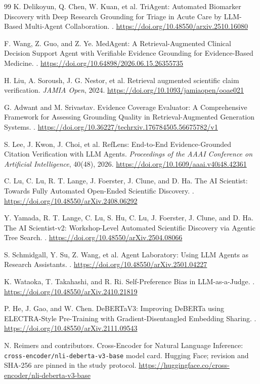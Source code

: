 \documentclass[11pt]{article}
\begin{document}
\begin{thebibliography}{99}
K. Delikoyun, Q. Chen, W. Kuan, et al.
\newblock TriAgent: Automated Biomarker Discovery with Deep Research Grounding for Triage in Acute Care by LLM-Based Multi-Agent Collaboration.
. \url{https://doi.org/10.48550/arxiv.2510.16080}

F. Wang, Z. Guo, and Z. Ye.
\newblock MedAgent: A Retrieval-Augmented Clinical Decision Support Agent with Verifiable Evidence Grounding for Evidence-Based Medicine.
. \url{https://doi.org/10.64898/2026.06.15.26355735}

H. Liu, A. Soroush, J. G. Nestor, et al.
\newblock Retrieval augmented scientific claim verification.
\newblock \emph{JAMIA Open}, 2024. \url{https://doi.org/10.1093/jamiaopen/ooae021}

G. Adwant and M. Srivastav.
\newblock Evidence Coverage Evaluator: A Comprehensive Framework for Assessing Grounding Quality in Retrieval-Augmented Generation Systems.
. \url{https://doi.org/10.36227/techrxiv.176784505.56675782/v1}

S. Lee, J. Kwon, J. Choi, et al.
\newblock RefLens: End-to-End Evidence-Grounded Citation Verification with LLM Agents.
\newblock \emph{Proceedings of the AAAI Conference on Artificial Intelligence}, 40(48), 2026. \url{https://doi.org/10.1609/aaai.v40i48.42361}

C. Lu, C. Lu, R. T. Lange, J. Foerster, J. Clune, and D. Ha.
\newblock The AI Scientist: Towards Fully Automated Open-Ended Scientific Discovery.
. \url{https://doi.org/10.48550/arXiv.2408.06292}

Y. Yamada, R. T. Lange, C. Lu, S. Hu, C. Lu, J. Foerster, J. Clune, and D. Ha.
\newblock The AI Scientist-v2: Workshop-Level Automated Scientific Discovery via Agentic Tree Search.
. \url{https://doi.org/10.48550/arXiv.2504.08066}

S. Schmidgall, Y. Su, Z. Wang, et al.
\newblock Agent Laboratory: Using LLM Agents as Research Assistants.
. \url{https://doi.org/10.48550/arXiv.2501.04227}

K. Wataoka, T. Takahashi, and R. Ri.
\newblock Self-Preference Bias in LLM-as-a-Judge.
. \url{https://doi.org/10.48550/arXiv.2410.21819}

P. He, J. Gao, and W. Chen.
\newblock DeBERTaV3: Improving DeBERTa using ELECTRA-Style Pre-Training with Gradient-Disentangled Embedding Sharing.
. \url{https://doi.org/10.48550/arXiv.2111.09543}

N. Reimers and contributors.
\newblock Cross-Encoder for Natural Language Inference: \texttt{cross-encoder/nli-deberta-v3-base} model card.
\newblock Hugging Face; revision and SHA-256 are pinned in the study protocol. \url{https://huggingface.co/cross-encoder/nli-deberta-v3-base}

\end{thebibliography}
\end{document}
